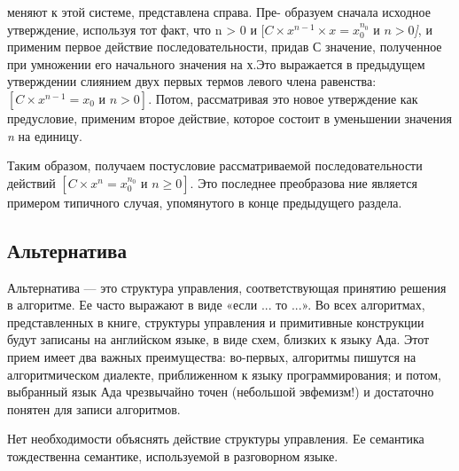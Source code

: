 \noindent меняют к этой системе, представлена справа. Пре­-\linebreak
образуем сначала исходное утверждение, используя тот 
факт, что 
\noindent n > 0 и \textit{$[C\times x^{n-1} \times x = x_{0}^{n_{0}} \text{ и } n > 0 $]}, и применим
первое  действие  последовательности, придав С значение, полученное 
при умножении его начального значения на х.Это выражается в 
пре­дыдущем утверждении слиянием двух первых термов левого члена 
ра­венства:\textit{$[C\times x^{n-1} = x_{0} \text{ и } n > 0]$}. Потом, рассматривая это новое 
утвер­ждение как  предусловие,  применим  второе действие, которое состоит 
в уменьшении значения \textit{n} на единицу.

Таким образом, получаем постусловие  рассматриваемой последова­тельности
 действий \textit{$[C\times x^{n} = x_{0}^{n_{0}} \textit{ и } n \geqslant 0]$}. Это последнее преобразова­
ние является примером типичного случая, упомянутого в конце преды­дущего раздела.

\subsection{Альтернатива}
\noindent Альтернатива — это структура управления,  соответствующая приня­тию решения в алгоритме. Ее часто выражают в виде «если ...  то  ...». 
Во всех алгоритмах, представленных в книге, структуры управления и 
примитивные конструкции будут записаны на английском языке, в 
ви­де схем, близких к языку Ада.  Этот прием имеет два важных 
преиму­щества: во-первых, алгоритмы пишутся на алгоритмическом диалекте, 
приближенном к языку  программирования; и потом,  выбранный язык 
Ада чрезвычайно точен  (небольшой эвфемизм!)  и достаточно понятен 
для записи алгоритмов.

Нет необходимости объяснять действие структуры  управления.  Ее 
семантика тождественна семантике, используемой в разговорном языке.
\newline
\pagebreak

